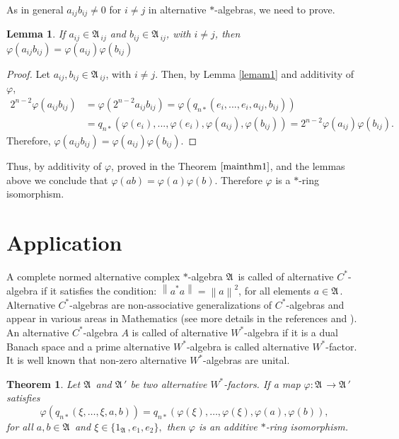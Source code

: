 \documentclass{amsart}
\newtheorem{theorem}{Theorem}[section]
\newtheorem{lemma}{Lemma}[section]
\def\A{{\mathfrak A}\, }
\begin{document}
As in general $a_{ij}b_{ij} \neq 0$ for $i \neq j$ in alternative $*$-algebras, we need to prove.

\begin{lemma}\label{lemam6}
If $a_{ij} \in \A_{ij}$ and $b_{ij} \in \A_{ij}$, with $i \neq j$, then $\varphi(a_{ij}b_{ij}) = \varphi(a_{ij})\varphi(b_{ij})$
\end{lemma}
\begin{proof}
Let $a_{ij}, b_{ij} \in \A_{ij}$, with $i \neq j$. Then, by Lemma \ref{lemam1} and additivity of $\varphi$,
$$
\begin{aligned}
2^{n-2}\varphi(a_{ij}b_{ij}) &= \varphi(2^{n-2}a_{ij}b_{ij}) = \varphi(q_{n*}(e_i,...,e_i,a_{ij},b_{ij})) \\
            &= q_{n*}(\varphi(e_i),...,\varphi(e_i),\varphi(a_{ij}),\varphi(b_{ij})) = 2^{n-2}\varphi(a_{ij})\varphi(b_{ij}).
\end{aligned}
$$
Therefore, $\varphi(a_{ij}b_{ij}) = \varphi(a_{ij})\varphi(b_{ij}).$
\end{proof}

Thus, by additivity of $\varphi$, proved in the Theorem $\ref{mainthm1}$, and the lemmas above we conclude that $\varphi(ab) = \varphi(a)\varphi(b)$. Therefore $\varphi$ is a $*$-ring isomorphism.

\section{Application}

A complete normed alternative complex $*$-algebra $\A$ is called of alternative
$C^{*}$-algebra if it satisfies the condition: $\left\|a^{*}a\right\| = \left\|a\right\|^2$, for all elements $a \in \A$. Alternative $C^{*}$-algebras are non-associative generalizations of
$C^{*}$-algebras and appear in various areas in Mathematics (see more details in the references \cite{Miguel1} and \cite{Miguel2}). 
An alternative $C^{*}$-algebra $A$ is called of alternative $W^{*}$-algebra if it is a dual Banach space and a prime alternative $W^{*}$-algebra is called
alternative $W^{*}$-factor. It is well known that non-zero alternative $W^{*}$-algebras are unital. %

\begin{theorem}
Let $\A$ and $\A'$ be two alternative $W^{*}$-factors. If a map $\varphi : \A \rightarrow \A'$ satisfies
$$\varphi(q_{n*}(\xi, \ldots, \xi, a,b)) =
q_{n*}(\varphi(\xi), \ldots, \varphi(\xi), \varphi(a),\varphi(b)),$$
for all $a,b\in \A$ and $\xi \in \{1_\A, e_1, e_2\},$ then $\varphi$ is an additive $*$-ring isomorphism.  
\end{theorem}
\end{document}
